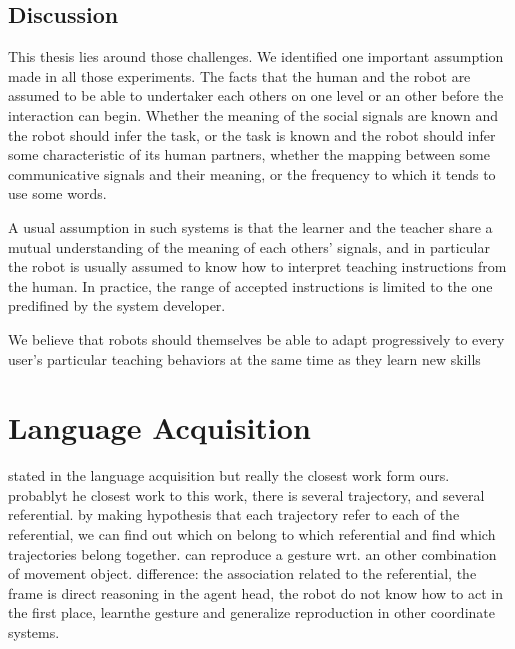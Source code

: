 \subsection{Discussion}

This thesis lies around those challenges. We identified one important assumption made in all those experiments. The facts that the human and the robot are assumed to be able to undertaker each others on one level or an other before the interaction can begin. Whether the meaning of the social signals are known and the robot should infer the task, or the task is known and the robot should infer some characteristic of its human partners, whether the mapping between some communicative signals and their meaning, or the frequency to which it tends to use some words.


A usual assumption in such systems is that the learner and the teacher share a mutual understanding of the meaning of each others' signals, and in particular the robot is usually assumed to know how to interpret teaching instructions from the human. In practice, the range of accepted instructions is limited to the one  predifined by the system developer.

 We believe that robots should themselves be able to adapt progressively to every user's particular teaching behaviors at the same time as they learn new skills

\section{Language Acquisition}
\label{chapter:related:language}

stated in the language acquisition but really the closest work form ours. \cite{cederborg2011imitating} probablyt he closest work to this work, there is several trajectory, and several referential. by making hypothesis that each trajectory refer to each of the referential, we can find out which on belong to which referential and find which trajectories belong together. can reproduce a gesture wrt. an other combination of movement object. 
difference: the association related to the referential, the frame is direct reasoning in the agent head, the robot do not know how to act in the first place, learnthe gesture and generalize reproduction in other coordinate systems.

